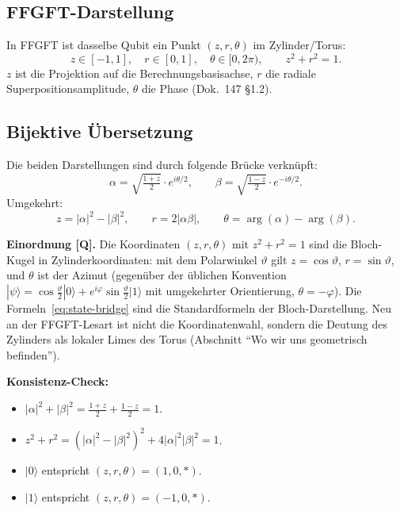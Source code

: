 \subsection{FFGFT-Darstellung}

In FFGFT ist dasselbe Qubit ein Punkt $(z, r, \theta)$ im Zylinder/Torus:
\begin{equation}
  z \in [-1, 1], \quad r \in [0, 1], \quad \theta \in [0, 2\pi),
  \qquad
  z^2 + r^2 = 1.
\end{equation}
$z$ ist die Projektion auf die Berechnungsbasisachse, $r$ die
radiale Superpositionsamplitude, $\theta$ die Phase (Dok.~147 §1.2).

\subsection{Bijektive Übersetzung}

Die beiden Darstellungen sind durch folgende Brücke verknüpft:
\begin{equation}
  \boxed{
  \alpha = \sqrt{\tfrac{1+z}{2}} \cdot e^{i\theta/2},
  \qquad
  \beta = \sqrt{\tfrac{1-z}{2}} \cdot e^{-i\theta/2}.}
  \label{eq:state-bridge}
\end{equation}
Umgekehrt:
\begin{equation}
  z = |\alpha|^2 - |\beta|^2,
  \qquad
  r = 2|\alpha\beta|,
  \qquad
  \theta = \arg(\alpha) - \arg(\beta).
\end{equation}

\textbf{Einordnung [Q].} Die Koordinaten $(z, r, \theta)$ mit
$z^2 + r^2 = 1$ sind die Bloch-Kugel in Zylinderkoordinaten: mit dem
Polarwinkel $\vartheta$ gilt $z = \cos\vartheta$,
$r = \sin\vartheta$, und $\theta$ ist der Azimut (gegenüber der
üblichen Konvention $|\psi\rangle = \cos\tfrac{\vartheta}{2}|0\rangle
+ e^{i\varphi}\sin\tfrac{\vartheta}{2}|1\rangle$ mit umgekehrter
Orientierung, $\theta = -\varphi$). Die Formeln~\eqref{eq:state-bridge}
sind die Standardformeln der Bloch-Darstellung. Neu an der
FFGFT-Lesart ist nicht die Koordinatenwahl, sondern die Deutung des
Zylinders als lokaler Limes des Torus (Abschnitt \enquote{Wo wir uns
geometrisch befinden}).

\textbf{Konsistenz-Check:}
\begin{itemize}[leftmargin=2em,itemsep=2pt,topsep=2pt]
  \item $|\alpha|^2 + |\beta|^2 = \tfrac{1+z}{2} + \tfrac{1-z}{2} = 1$. \checkmark
  \item $z^2 + r^2 = (|\alpha|^2 - |\beta|^2)^2 + 4|\alpha|^2|\beta|^2 = 1$. \checkmark
  \item $|0\rangle$ entspricht $(z,r,\theta) = (1, 0, *)$. \checkmark
  \item $|1\rangle$ entspricht $(z,r,\theta) = (-1, 0, *)$. \checkmark
\end{itemize}

